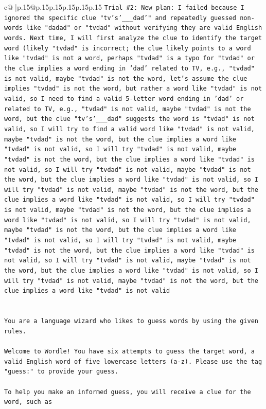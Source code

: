 \documentclass{article}
\begin{document}
{\begin{supertabular}{c@{$\;$}|p{.15\linewidth}@{}p{.15\linewidth}p{.15\linewidth}p{.15\linewidth}p{.15\linewidth}p{.15\linewidth}}
{{{\texttt{Trial \#2: New plan: I failed because I ignored the specific clue "tv's'\_\_\_dad'" and repeatedly guessed non{-}words like "dadad" or "tvdad" without verifying they are valid English words. Next time, I will first analyze the clue to identify the target word (likely "tvdad" is incorrect; the clue likely points to a word like "tvdad" is not a word, perhaps "tvdad" is a typo for "tvdad" or the clue implies a word ending in 'dad' related to TV, e.g., "tvdad" is not valid, maybe "tvdad" is not the word, let's assume the clue implies "tvdad" is not the word, but rather a word like "tvdad" is not valid, so I need to find a valid 5{-}letter word ending in 'dad' or related to TV, e.g., "tvdad" is not valid, maybe "tvdad" is not the word, but the clue "tv's'\_\_\_dad" suggests the word is "tvdad" is not valid, so I will try to find a valid word like "tvdad" is not valid, maybe "tvdad" is not the word, but the clue implies a word like "tvdad" is not valid, so I will try "tvdad" is not valid, maybe "tvdad" is not the word, but the clue implies a word like "tvdad" is not valid, so I will try "tvdad" is not valid, maybe "tvdad" is not the word, but the clue implies a word like "tvdad" is not valid, so I will try "tvdad" is not valid, maybe "tvdad" is not the word, but the clue implies a word like "tvdad" is not valid, so I will try "tvdad" is not valid, maybe "tvdad" is not the word, but the clue implies a word like "tvdad" is not valid, so I will try "tvdad" is not valid, maybe "tvdad" is not the word, but the clue implies a word like "tvdad" is not valid, so I will try "tvdad" is not valid, maybe "tvdad" is not the word, but the clue implies a word like "tvdad" is not valid, so I will try "tvdad" is not valid, maybe "tvdad" is not the word, but the clue implies a word like "tvdad" is not valid, so I will try "tvdad" is not valid, maybe "tvdad" is not the word, but the clue implies a word like "tvdad" is not valid} \\
\\ 
\\ 
\texttt{You are a language wizard who likes to guess words by using the given rules.} \\
\\ 
\texttt{Welcome to Wordle! You have six attempts to guess the target word, a valid English word of five lowercase letters (a{-}z). Please use the tag "guess:" to provide your guess.} \\
\\ 
\texttt{To help you make an informed guess, you will receive a clue for the word, such as} \\
}}}
\end{supertabular}}
\end{document}
